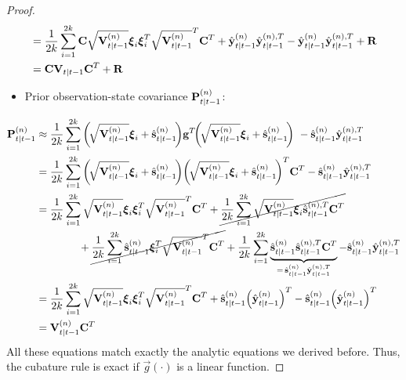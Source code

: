 \begin{proof}
\begin{align*}
				&= \frac{1}{2k} \sum_{i = 1}^{2k} \boldsymbol{\mathrm{C}} \sqrt{\boldsymbol{\mathrm{V}}_{t \vert t - 1}^{(n)}} \boldsymbol{\mathrm{\xi}}_i \boldsymbol{\mathrm{\xi}}_i^T \sqrt{\boldsymbol{\mathrm{V}}_{t \vert t - 1}^{(n)}}^T \boldsymbol{\mathrm{C}}^T + \hat{\boldsymbol{\mathrm{y}}}_{t \vert t - 1}^{(n)} \hat{\boldsymbol{\mathrm{y}}}_{t \vert t - 1}^{(n), T} - \hat{\boldsymbol{\mathrm{y}}}_{t \vert t - 1}^{(n)} \hat{\boldsymbol{\mathrm{y}}}_{t \vert t - 1}^{(n), T} + \boldsymbol{\mathrm{R}} \\
				&= \boldsymbol{\mathrm{C}} \boldsymbol{\mathrm{V}}_{t \vert t - 1} \boldsymbol{\mathrm{C}}^T + \boldsymbol{\mathrm{R}}
		\end{align*}
		\begin{itemize}
			\item Prior observation-state covariance \( \boldsymbol{\mathrm{P}}_{t \vert t - 1}^{(n)} \):
		\end{itemize}
		\begin{align*}
			\mat{P}_{t \subgiven t - 1}^{(n)}
				&\approx \frac{1}{2k} \sum_{i = 1}^{2k} \bigg(\!\sqrt{\mat{V}_{t \subgiven t - 1}^{(n)}} \vec{\xi}_i + \hat{\vec{s}}_{t \subgiven t - 1}^{(n)}\!\bigg) \vec{g}^T\!\bigg(\!\sqrt{\mat{V}_{t \subgiven t - 1}^{(n)}} \vec{\xi}_i + \hat{\vec{s}}_{t \subgiven t - 1}^{(n)}\!\bigg)\ - \hat{\vec{s}}_{t \subgiven t - 1}^{(n)} \hat{\vec{y}}_{t \subgiven t - 1}^{(n), T} \\
				&= \frac{1}{2k} \sum_{i = 1}^{2k} \bigg(\!\sqrt{\mat{V}_{t \subgiven t - 1}^{(n)}} \vec{\xi}_i + \hat{\vec{s}}_{t \subgiven t - 1}^{(n)}\!\bigg) \bigg(\!\sqrt{\mat{V}_{t \subgiven t - 1}^{(n)}} \vec{\xi}_i + \hat{\vec{s}}_{t \subgiven t - 1}^{(n)}\!\bigg)^T \mat{C}^T - \hat{\vec{s}}_{t \subgiven t - 1}^{(n)} \hat{\vec{y}}_{t \subgiven t - 1}^{(n), T} \\
				&= \frac{1}{2k} \sum_{i = 1}^{2k} \sqrt{\mat{V}_{t \subgiven t - 1}^{(n)}} \vec{\xi}_i \vec{\xi}_i^T \sqrt{\mat{V}_{t \subgiven t - 1}^{(n)}}^T \mat{C}^T + \cancel{\frac{1}{2k} \sum_{i = 1}^{2k} \sqrt{\mat{V}_{t \subgiven t - 1}^{(n)}} \vec{\xi}_i \hat{\vec{s}}_{t \subgiven t - 1}^{(n), T} \mat{C}^T} \\
					&\qquad\qquad + \cancel{\frac{1}{2k} \sum_{i = 1}^{2k} \hat{\vec{s}}_{t \subgiven t - 1}^{(n)} \vec{\xi}_i^T \sqrt{\mat{V}_{t \subgiven t - 1}^{(n)}}^T \mat{C}^T} + \frac{1}{2k} \sum_{i = 1}^{2k} \underbrace{\hat{\vec{s}}_{t \subgiven t - 1}^{(n)} \hat{\vec{s}}_{t \subgiven t - 1}^{(n), T} \mat{C}^T}_{=\, \hat{\vec{s}}_{t \subgiven t - 1}^{(n)} \hat{\vec{y}}_{t \subgiven t - 1}^{(n), T}} - \hat{\vec{s}}_{t \subgiven t - 1}^{(n)} \hat{\vec{y}}_{t \subgiven t - 1}^{(n), T} \\
				&= \frac{1}{2k} \sum_{i = 1}^{2k} \sqrt{\mat{V}_{t \subgiven t - 1}^{(n)}} \vec{\xi}_i \vec{\xi}_i^T \sqrt{\mat{V}_{t \subgiven t - 1}^{(n)}}^T \mat{C}^T + \hat{\vec{s}}_{t \subgiven t - 1}^{(n)} \Big( \hat{\vec{y}}_{t \subgiven t - 1}^{(n)} \Big)^T - \hat{\vec{s}}_{t \subgiven t - 1}^{(n)} \Big( \hat{\vec{y}}_{t \subgiven t - 1}^{(n)} \Big)^T \\
				&= \mat{V}_{t \subgiven t - 1}^{(n)} \mat{C}^T
		\end{align*}
		All these equations match exactly the analytic equations we derived before. Thus, the cubature rule is exact if \(\vec{g}(\cdot)\) is a linear function.
	\end{proof}
